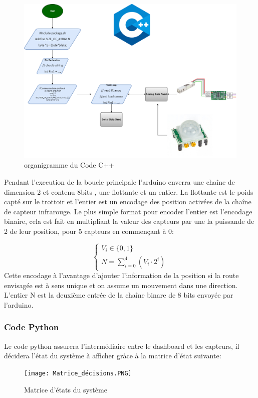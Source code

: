 \documentclass[journal]{IEEEtran}
\begin{document}
\begin{figure}[htbp]
    \centerline{\includegraphics[scale = 0.2]{Trottoir_Flowchart_arduino.drawio.png}}
    \caption{organigramme du Code C++}
    \label{fig3}
\end{figure} 

Pendant l'execution de la boucle principale l'arduino enverra une chaîne de dimension 2 et contenu 8bits , une flottante et un entier. La flottante est le poids capté sur le trottoir et l'entier est un encodage des position
activées de la chaîne de capteur infrarouge. Le plus simple format pour encoder l'entier est l'encodage binaire, cela est fait en multipliant la valeur des capteurs par une la puissande de 2 de leur position, pour 
5 capteurs en commençant à 0:

\begin{equation}\label{eq-1}
    \left\{\begin{aligned}
        V_i \in \{0,1\} \\
        N = \sum_{i=0}^{4}(V_i\cdot 2^i)
    \end{aligned} \right. 
\end{equation}
Cette encodage à l'avantage d'ajouter l'information de la position si la route envisagée est à sens unique et on assume un mouvement dans une direction. L'entier N est la deuxième entrée de la chaîne binare de 
8 bits envoyée par l'arduino.

\subsubsection{Code Python}
Le code python assurera l'intermédiaire entre le dashboard et les capteurs, il décidera l'état du système à afficher gràce à la matrice  d'état suivante:
\begin{figure}[htbp]
    \centerline{\texttt{[image: Matrice\_décisions.PNG]}}
    \caption{Matrice d'états du système}
    \label{fig4}
\end{figure} 
\end{document}
